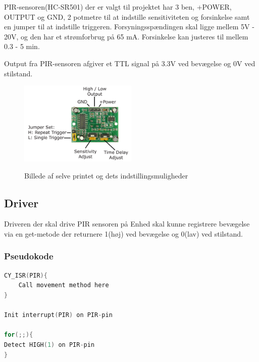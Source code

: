 PIR-sensoren(HC-SR501) der er valgt til projektet har 3 ben, +POWER, OUTPUT og GND, 2 potmetre til at indstille sensitiviteten og forsinkelse samt en jumper til at indstille triggeren. Forsyningsspændingen skal ligge mellem 5V - 20V, og den har et strømforbrug på 65 mA. Forsinkelse kan justeres til mellem 0.3 - 5 min.

Output fra PIR-sensoren afgiver et TTL signal på 3.3V ved bevægelse og 0V ved stilstand.

\begin{figure}[H] \centering
{\includegraphics[width=0.5\textwidth]{filer/design/Billeder/pir_overview}}
\caption{Billede af selve printet og dets indstillingsmuligheder}
\label{lab:pir_overview}
\raggedright
\end{figure}

\subsection*{Driver}

Driveren der skal drive PIR sensoren på Enhed skal kunne registrere bevægelse via en get-metode der returnere 1(høj) ved bevægelse og 0(lav) ved stilstand.

\subsubsection*{Pseudokode}

\begin{lstlisting}[language=C]
CY_ISR(PIR){
    Call movement method here
} 

Init interrupt(PIR) on PIR-pin

for(;;){
Detect HIGH(1) on PIR-pin
}
\end{lstlisting}